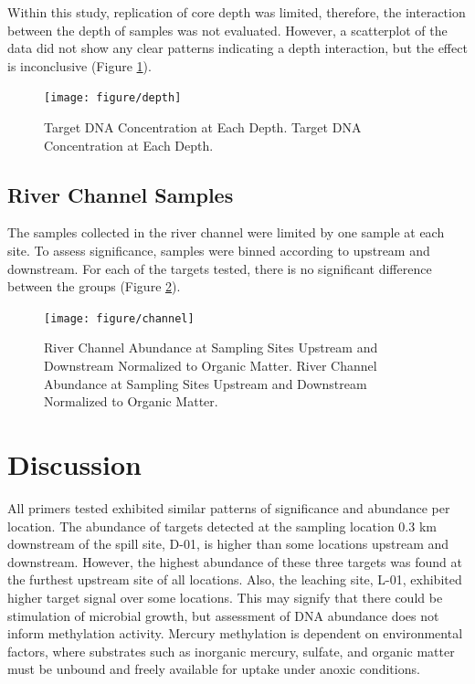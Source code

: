 \documentclass[ms, hidelinks]{uncgdissertationexp3}
\theoremstyle{plain}
\theoremstyle{definition}
\theoremstyle{remark}
\newcommand{\titlecaption}[2]{\caption[#1]{#1. #2}}
\begin{document}
Within this study, replication of core depth was limited, therefore, the interaction between the depth of samples was not evaluated. However, a scatterplot of the data did not show any clear patterns indicating a depth interaction, but the effect is inconclusive (Figure \ref{fig:depth}).

\begin{figure}[htbp]
\texttt{[image: figure/depth]}
   \titlecaption{Target DNA Concentration at Each Depth}{Target DNA Concentration at Each Depth.}
   \label{fig:depth}
   \vspace{18pt}
\end{figure}


\subsection{River Channel Samples}\label{river-channel-samples}

The samples collected in the river channel were limited by one sample at each site. To assess significance, samples were binned according to upstream and downstream. For each of the targets tested, there is no significant difference between the groups (Figure \ref{fig:channel}).

\begin{figure}[htbp]
  \texttt{[image: figure/channel]}
  \titlecaption{River Channel Abundance at Sampling Sites Upstream and Downstream Normalized to Organic Matter}{River Channel Abundance at Sampling Sites Upstream and Downstream Normalized to Organic Matter.}\label{fig:channel}
  \vspace{12pt}
\end{figure}


\section{Discussion}\label{discussion}
All primers tested exhibited similar patterns of significance and abundance per location. The abundance of targets detected at the sampling location 0.3 km downstream of the spill site, D-01, is higher than some locations upstream and downstream. However, the highest abundance of these three targets was found at the furthest upstream site of all locations. Also, the leaching site, L-01, exhibited higher target signal over some locations. This may signify that there could be stimulation of microbial growth, but assessment of DNA abundance does not inform methylation activity. Mercury methylation is dependent on environmental factors, where substrates such as inorganic mercury, sulfate, and organic matter must be unbound and freely available for uptake under anoxic conditions.
\end{document}
